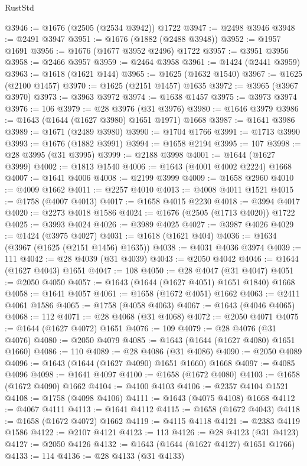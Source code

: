 \begin{lexlean}{RustStd}
\begin{coremodule}
@3946 := @1676 (@2505 (@2534 @3942)) @1722
@3947 := @2498 @3946
@3948 := @2491 @3947
@3951 := @1676 (@1882 (@2488 @3948))
@3952 := @1957 @1691
@3956 := @1676 (@1677 @3952 @2496) @1722
@3957 := @3951 @3956
@3958 := @2466 @3957
@3959 := @2464 @3958
@3961 := @1424 (@2441 @3959)
@3963 := @1618 (@1621 @144)
@3965 := @1625 (@1632 @1540)
@3967 := @1625 (@2100 @1457)
@3970 := @1625 (@2151 @1457) @1635
@3972 := @3965 (@3967 @3970)
@3973 := @3963 @3972
@3974 := @1638 @1457
@3975 := @3973 @3974
@3976 := 106
@3979 := @28 @3976 (@31 @3976)
@3980 := @1646 @3979
@3986 := @1643 (@1644 (@1627 @3980) @1651 @1971) @1668
@3987 := @1641 @3986
@3989 := @1671 (@2489 @3980)
@3990 := @1704 @1766
@3991 := @1713 @3990
@3993 := @1676 (@1882 @3991)
@3994 := @1658 @2194
@3995 := 107
@3998 := @28 @3995 (@31 @3995)
@3999 := @2188 @3998
@4001 := @1644 (@1627 @3999)
@4002 := @1813 @1540
@4006 := @1643 (@4001 @4002 @2224) @1668
@4007 := @1641 @4006
@4008 := @2199 @3999
@4009 := @1658 @2960
@4010 := @4009 @1662
@4011 := @2257 @4010
@4013 := @4008 @4011 @1521
@4015 := @1758 (@4007 @4013)
@4017 := @1658 @4015 @2230
@4018 := @3994 @4017
@4020 := @2273 @4018 @1586
@4024 := @1676 (@2505 (@1713 @4020)) @1722
@4025 := @3993 @4024
@4026 := @3989 @4025
@4027 := @3987 @4026
@4029 := @1424 (@3975 @4027)
@4031 := @1618 (@1621 @404)
@4036 := @1634 (@3967 (@1625 (@2151 @1456) @1635))
@4038 := @4031 @4036 @3974
@4039 := 111
@4042 := @28 @4039 (@31 @4039)
@4043 := @2050 @4042
@4046 := @1644 (@1627 @4043) @1651
@4047 := 108
@4050 := @28 @4047 (@31 @4047)
@4051 := @2050 @4050
@4057 := @1643 (@1644 (@1627 @4051) @1651 @1840) @1668
@4058 := @1641 @4057
@4061 := @1658 (@1672 @4051) @1662
@4063 := @2411 @4061 @1586
@4065 := @1758 (@4058 @4063)
@4067 := @1643 (@4046 @4065)
@4068 := 112
@4071 := @28 @4068 (@31 @4068)
@4072 := @2050 @4071
@4075 := @1644 (@1627 @4072) @1651
@4076 := 109
@4079 := @28 @4076 (@31 @4076)
@4080 := @2050 @4079
@4085 := @1643 (@1644 (@1627 @4080) @1651 @1660)
@4086 := 110
@4089 := @28 @4086 (@31 @4086)
@4090 := @2050 @4089
@4096 := @1643 (@1644 (@1627 @4090) @1651 @1660) @1668
@4097 := @4085 @4096
@4098 := @1641 @4097
@4100 := @1658 (@1672 @4080)
@4103 := @1658 (@1672 @4090) @1662
@4104 := @4100 @4103
@4106 := @2357 @4104 @1521
@4108 := @1758 (@4098 @4106)
@4111 := @1643 (@4075 @4108) @1668
@4112 := @4067 @4111
@4113 := @1641 @4112
@4115 := @1658 (@1672 @4043)
@4118 := @1658 (@1672 @4072) @1662
@4119 := @4115 @4118
@4121 := @2383 @4119 @1586
@4122 := @2107 @4121
@4123 := 113
@4126 := @28 @4123 (@31 @4123)
@4127 := @2050 @4126
@4132 := @1643 (@1644 (@1627 @4127) @1651 @1766)
@4133 := 114
@4136 := @28 @4133 (@31 @4133)

\end{coremodule}
\end{lexlean}
